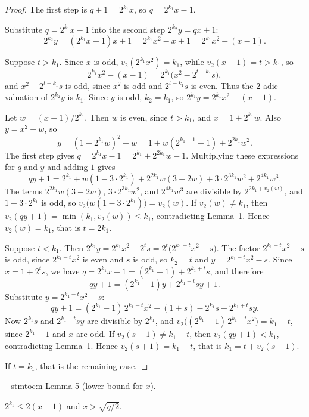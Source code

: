 \documentclass[11pt]{article}
\newenvironment{named}[1]{%
  \par\addvspace{\medskipamount}%
  \pagebreak[3]%
  \noindent{\bfseries #1}\space\ignorespaces
  \stmtoc{#1}%
}{\par\addvspace{\medskipamount}}
\newcommand{\stmtoc}[1]{ \qn_stmtoc:n {#1} }
\begin{document}
\begin{proof}
The first step is $q + 1 = 2^{k_1} x$, so $q = 2^{k_1} x - 1$.

Substitute $q = 2^{k_1} x - 1$ into the second step $2^{k_2} y = qx + 1$:
\[
2^{k_2} y = (2^{k_1} x - 1)x + 1 = 2^{k_1} x^2 - x + 1 = 2^{k_1} x^2 - (x - 1).
\]

Suppose $t > k_1$.
Since $x$ is odd, $v_2(2^{k_1} x^2) = k_1$, while $v_2(x-1) = t > k_1$, so
\[
2^{k_1} x^2 - (x-1) = 2^{k_1}\bigl(x^2 - 2^{t-k_1}s\bigr),
\]
and $x^2 - 2^{t-k_1}s$ is odd, since $x^2$ is odd and $2^{t-k_1}s$ is even.
Thus the $2$-adic valuation of $2^{k_2} y$ is $k_1$. Since $y$ is odd, $k_2 = k_1$, so $2^{k_1} y = 2^{k_1} x^2 - (x-1)$.

Let $w = (x-1)/2^{k_1}$. Then $w$ is even, since $t > k_1$, and $x = 1 + 2^{k_1} w$.
Also $y = x^2 - w$, so
\[
y = (1 + 2^{k_1} w)^2 - w = 1 + w(2^{k_1+1} - 1) + 2^{2k_1} w^2.
\]
The first step gives $q = 2^{k_1} x - 1 = 2^{k_1} + 2^{2k_1} w - 1$.
Multiplying these expressions for $q$ and $y$ and adding $1$ gives
\[
qy + 1 = 2^{k_1} + w(1 - 3 \cdot 2^{k_1}) + 2^{2k_1} w(3 - 2w) + 3 \cdot 2^{3k_1} w^2 + 2^{4k_1} w^3.
\]
The terms $2^{2k_1} w(3 - 2w)$, $3 \cdot 2^{3k_1} w^2$, and $2^{4k_1} w^3$ are divisible by $2^{2k_1 + v_2(w)}$, and $1 - 3 \cdot 2^{k_1}$ is odd, so $v_2\bigl(w(1 - 3 \cdot 2^{k_1})\bigr) = v_2(w)$. If $v_2(w) \ne k_1$, then $v_2(qy + 1) = \min(k_1, v_2(w)) \le k_1$, contradicting Lemma~1.
Hence $v_2(w) = k_1$, that is $t = 2k_1$.

Suppose $t < k_1$.
Then $2^{k_2} y = 2^{k_1} x^2 - 2^t s = 2^t\bigl(2^{k_1-t}x^2 - s\bigr)$.
The factor $2^{k_1-t}x^2 - s$ is odd, since $2^{k_1-t}x^2$ is even and $s$ is odd, so $k_2 = t$ and $y = 2^{k_1-t}x^2 - s$.
Since $x = 1 + 2^t s$, we have $q = 2^{k_1} x - 1 = (2^{k_1} - 1) + 2^{k_1 + t} s$, and therefore
\[
qy + 1 = (2^{k_1}-1)y + 2^{k_1 + t} s y + 1.
\]
Substitute $y = 2^{k_1-t}x^2 - s$:
\[
qy + 1 = (2^{k_1}-1)\, 2^{k_1-t} x^2 + (1+s) - 2^{k_1} s + 2^{k_1 + t} s y.
\]
Now $2^{k_1} s$ and $2^{k_1 + t} s y$ are divisible by $2^{k_1}$, and $v_2\bigl((2^{k_1}-1)\, 2^{k_1-t} x^2\bigr) = k_1 - t$, since $2^{k_1}-1$ and $x$ are odd. If $v_2(s+1) \ne k_1 - t$, then $v_2(qy + 1) < k_1$, contradicting Lemma~1.
Hence $v_2(s+1) = k_1 - t$, that is $k_1 = t + v_2(s+1)$.

If $t = k_1$, that is the remaining case.
\end{proof}

\begin{named}{Lemma 5 (lower bound for $x$).}
$2^{k_1} \le 2(x-1)$ and $x > \sqrt{q/2}$.
\end{named}
\end{document}
